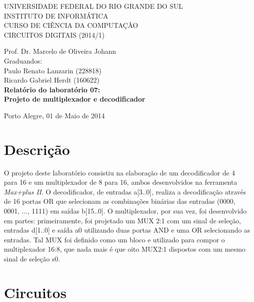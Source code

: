 \documentclass[a4paper]{article}
\begin{document}
\begin{titlepage}
\begin{center}


\large{ 
\uppercase{ Universidade Federal do Rio Grande do Sul\\

Instituto de Informática \\

Curso de Ciência da Computação \\

Circuitos Digitais (2014/1)\\
}

Prof. Dr. Marcelo de Oliveira Johann \\

Graduandos: \\ Paulo Renato Lanzarin (228818)
			\\ Ricardo Gabriel Herdt (160622) \\ [4.5cm]


\LARGE {\bfseries Relatório do laboratório 07: \\
	Projeto de multiplexador e decodificador\\[1.0cm]
}}


\vfill

Porto Alegre, 01 de Maio de 2014

\end{center}
\end{titlepage}
\section{Descrição}

	O projeto deste laboratório consistiu na elaboração de um decodificador
de 4 para 16 e um multiplexador de 8 para 16, ambos desenvolvidos na ferramenta
\emph{Max+plus II}. O decodificador, de entradas a[3..0], realiza a
decodificação através de 16 portas OR que selecionam  as combinações binárias
das entradas (0000, 0001, ..., 1111) em saídas b[15..0]. O multiplexador, por
sua vez, foi desenvolvido em partes: primeiramente, foi projetado um MUX 2:1
com um sinal de seleção, entradas d[1..0] e saída a0 utilizando duas portas AND
e uma OR selecionando as entradas. Tal MUX foi definido como um bloco e
utilizado para compor o multiplexador 16:8, que nada mais é que oito MUX2:1
dispostos com um mesmo sinal de seleção s0.



\FloatBarrier

\section{Circuitos}
\end{document}
